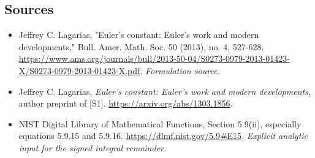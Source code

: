 \documentclass[11pt]{article}
\begin{document}
\subsection{Sources}
\begin{itemize}
\item[S1]Jeffrey C. Lagarias, "Euler's constant: Euler's work and modern developments," Bull. Amer. Math. Soc. 50 (2013), no. 4, 527-628.
\url{https://www.ams.org/journals/bull/2013-50-04/S0273-0979-2013-01423-X/S0273-0979-2013-01423-X.pdf}.
\textit{Formulation source.}
\item[E1]Jeffrey C. Lagarias, \emph{Euler's constant: Euler's work and modern developments}, author preprint of [S1].
\url{https://arxiv.org/abs/1303.1856}.
\item[E2]NIST Digital Library of Mathematical Functions, Section 5.9(ii), especially equations 5.9.15 and 5.9.16.
\url{https://dlmf.nist.gov/5.9#E15}.
\textit{Explicit analytic input for the signed integral remainder.}
\end{itemize}
\end{document}
